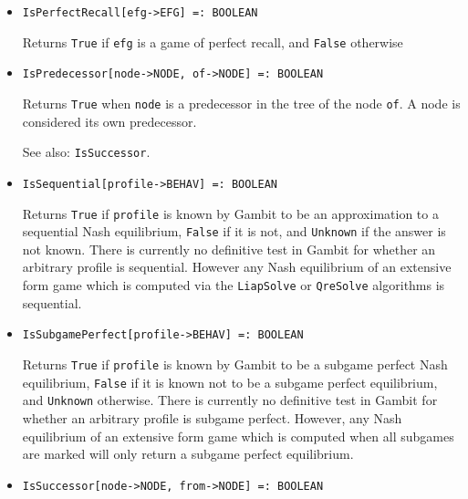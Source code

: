 \begin{itemize}
\item{}
\protect \large \begin{verbatim}
IsPerfectRecall[efg->EFG] =: BOOLEAN 
\end{verbatim}\normalsize

\bd 
Returns \verb+True+ if \verb+efg+ is a game of perfect recall, and
\verb+False+ otherwise 
\ed


\item{}
\protect \large \begin{verbatim}
IsPredecessor[node->NODE, of->NODE] =: BOOLEAN 
\end{verbatim}\normalsize

\bd
Returns \verb+True+ when \verb+node+ is a predecessor
in the tree of the node \verb+of+.  A node is considered its own predecessor.
\item [See also:] \verb+IsSuccessor+.
\ed

\item{}
\protect \large \begin{verbatim}
IsSequential[profile->BEHAV] =: BOOLEAN 
\end{verbatim}\normalsize

\bd 
Returns \verb+True+ if \verb+profile+
is known by Gambit to be an approximation to a
sequential Nash equilibrium, \verb+False+ if it is not, and \verb+Unknown+ if the answer is not known.  There is
currently no definitive test in Gambit for whether an arbitrary
profile is sequential.  However any Nash equilibrium of an extensive
form game which is computed via the \verb+LiapSolve+ or
\verb+QreSolve+ algorithms is sequential.
\ed

\item{}
\protect \large \begin{verbatim}
IsSubgamePerfect[profile->BEHAV] =: BOOLEAN 
\end{verbatim}\normalsize

\bd
Returns \verb+True+ if \verb+profile+
is known by Gambit to be a subgame perfect Nash
equilibrium, \verb+False+ if it is known not to be a subgame perfect equilibrium, and \verb+Unknown+ otherwise.  There is currently no
definitive test in Gambit for whether an arbitrary profile is subgame
perfect.  However, any Nash equilibrium of an extensive form game which
is computed when all subgames are marked will only return a subgame
perfect equilibrium.  
\ed

\item{}
\protect \large \begin{verbatim}
IsSuccessor[node->NODE, from->NODE] =: BOOLEAN 
\end{verbatim}\normalsize


\end{itemize}
